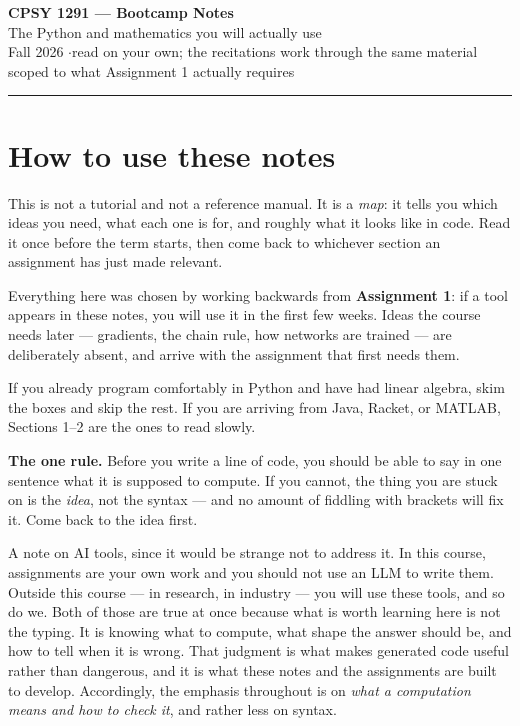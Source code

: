 \documentclass[11pt]{article}
\newcommand{\ask}[1]{\textcolor{accent}{\textbf{#1}}}
\begin{document}
\begin{center}
{\sffamily\LARGE\bfseries\color{brown} CPSY 1291 --- Bootcamp Notes}\\[3pt]
{\sffamily\large\color{ink} The Python and mathematics you will actually use}\\[6pt]
{\color{lightgray}\small Fall 2026 \quad$\cdot$\quad read on your own; the recitations work through the same material}\\[2pt]
{\color{lightgray}\small scoped to what Assignment 1 actually requires}
\end{center}
\vspace{4pt}
\hrule
\vspace{10pt}

\section*{How to use these notes}

This is not a tutorial and not a reference manual. It is a \emph{map}: it tells
you which ideas you need, what each one is for, and roughly what it looks like
in code. Read it once before the term starts, then come back to whichever
section an assignment has just made relevant.

Everything here was chosen by working backwards from \textbf{Assignment 1}:
if a tool appears in these notes, you will use it in the first few weeks. Ideas
the course needs later --- gradients, the chain rule, how networks are trained
--- are deliberately absent, and arrive with the assignment that first needs
them.

If you already program comfortably in Python and have had linear algebra, skim
the boxes and skip the rest. If you are arriving from Java, Racket, or MATLAB,
Sections 1--2 are the ones to read slowly.

\begin{keybox}
\ask{The one rule.} Before you write a line of code, you should be able to say
in one sentence what it is supposed to compute. If you cannot, the thing you
are stuck on is the \emph{idea}, not the syntax --- and no amount of fiddling
with brackets will fix it. Come back to the idea first.
\end{keybox}

A note on AI tools, since it would be strange not to address it. In this
course, assignments are your own work and you should not use an LLM to write
them. Outside this course --- in research, in industry --- you will use these
tools, and so do we. Both of those are true at once because what is worth
learning here is not the typing. It is knowing what to compute, what shape the
answer should be, and how to tell when it is wrong. That judgment is what makes
generated code useful rather than dangerous, and it is what these notes and the
assignments are built to develop. Accordingly, the emphasis throughout is on
\emph{what a computation means and how to check it}, and rather less on syntax.
\end{document}

